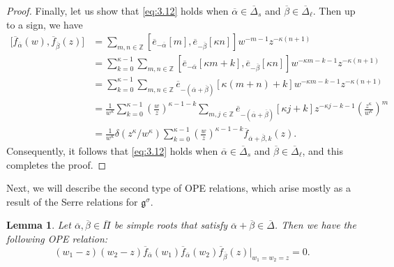 \documentclass[10pt,a4paper]{amsart}
\numberwithin{equation}{section}
\newtheorem{Lemma}[Theorem]{Lemma}
\begin{document}
\begin{proof}
Finally, let us show that \eqref{eq:3.12} holds when $\overline{\alpha}\in\overline{\Delta}_s$ and $\overline{\beta}\in\overline{\Delta}_{\ell}$. Then up to a sign, we have
\begin{align*}
\bigl[\overline{f}_{\overline{\alpha}}(w), \overline{f}_{\overline{\beta}}(z)\bigr]
&=\sum_{m,n\in\mathbb{Z}}[\overline{e}_{-\overline{\alpha}}[m],\overline{e}_{-\overline{\beta}}[\kappa n]]w^{-m-1}z^{-\kappa(n+1)}\\
&=\sum_{k=0}^{\kappa-1}\sum_{m,n\in\mathbb{Z}}[\overline{e}_{-\overline{\alpha}}[\kappa m+k],\overline{e}_{-\overline{\beta}}[\kappa n]]w^{-\kappa m-k-1}z^{-\kappa(n+1)}\\
&=\sum_{k=0}^{\kappa-1}\sum_{m,n\in\mathbb{Z}}\overline{e}_{-\left( \overline{\alpha}+\overline{\beta}\right)}[\kappa(m+n)+k]w^{-\kappa m-k-1}z^{-\kappa(n+1)}\\
&=\frac{1}{w^{\kappa}}\sum_{k=0}^{\kappa-1}\left(\frac{w}{z}\right)^{\kappa-1-k}\sum_{m,j\in\mathbb{Z}}\overline{e}_{-\left(\overline{\alpha}+\overline{\beta} \right)}[\kappa j+k] z^{-\kappa j-k-1}\left(\frac{z^{\kappa}}{w^{\kappa}}\right)^m\\
&=\frac{1}{w^{\kappa}}\delta(z^{\kappa}/w^{\kappa}) \sum_{k=0}^{\kappa-1}\left(\frac{w}{z}\right)^{\kappa-1-k} \overline{f}_{\overline{\alpha}+\overline{\beta},k}(z).
\end{align*}
Consequently, it follows that \eqref{eq:3.12} holds when $\overline{\alpha}\in\overline{\Delta}_s$ and $\overline{\beta}\in\overline{\Delta}_{\ell}$, and this completes the proof.
\end{proof}

Next, we will describe the second type of OPE relations, which arise mostly as a result of the Serre relations for $\mathfrak{g}^{\sigma}$.

\begin{Lemma}\label{3.3}
Let $\overline{\alpha},\overline{\beta}\in\overline{\Pi}$ be simple roots that satisfy $\overline{\alpha}+\overline{\beta} \in\overline{\Delta}$. Then we have the following OPE relation:
\begin{equation}\label{eq:3.13}
(w_1-z)(w_2-z)\overline{f}_{\overline{\alpha}}(w_1) \overline{f}_{\overline{\alpha}}(w_2) \overline{f}_{\overline{\beta}}(z)\big|_{w_1=w_2=z}=0.
\end{equation}
\end{Lemma}
\end{document}

